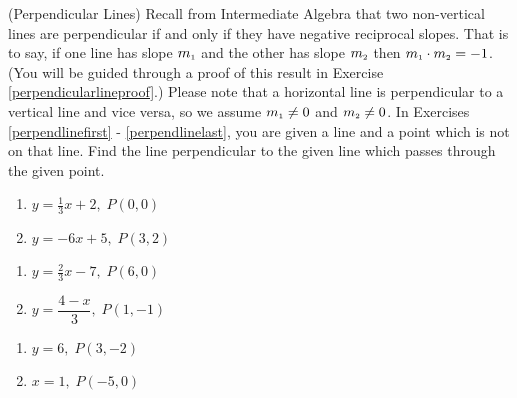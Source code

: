 \label{perpendicularlines}

(Perpendicular Lines)  Recall from Intermediate Algebra that two non-vertical lines are perpendicular if and only if they have negative reciprocal slopes.  That is to say, if one line has slope $m_{\mbox{\tiny$1$}}$ and the other has slope $m_{\mbox{\tiny$2$}}$ then $m_{\mbox{\tiny$1$}} \cdot m_{\mbox{\tiny$2$}} = -1$.  (You will be guided through a proof of this result in Exercise \ref{perpendicularlineproof}.)  Please note that a horizontal line is perpendicular to a vertical line and vice versa, so we assume $m_{\mbox{\tiny$1$}} \neq 0$ and $m_{\mbox{\tiny$2$}} \neq 0$.  In Exercises \ref{perpendlinefirst} - \ref{perpendlinelast}, you are given a line and a point which is not on that line.  Find the line perpendicular to the given line which passes through the given point.

\begin{multicols}{2}
\begin{enumerate}
\setcounter{enumi}{\value{HW}}


\item $y = \frac{1}{3}x + 2, \; P(0, 0)$ \label{perpendlinefirst}
\item $y = -6x + 5, \; P(3, 2)$

\setcounter{HW}{\value{enumi}}
\end{enumerate}
\end{multicols}

\begin{multicols}{2}
\begin{enumerate}
\setcounter{enumi}{\value{HW}}

\item $y = \frac{2}{3} x - 7, \; P(6, 0)$
\item $y = \dfrac{4-x}{3}, \; P(1, -1)$


\setcounter{HW}{\value{enumi}}
\end{enumerate}
\end{multicols}

\begin{multicols}{2}
\begin{enumerate}
\setcounter{enumi}{\value{HW}}

\item $y = 6, \; P(3, -2)$
\item $x=1, \; P(-5,0)$ \label{perpendlinelast}


\setcounter{HW}{\value{enumi}}
\end{enumerate}
\end{multicols}


